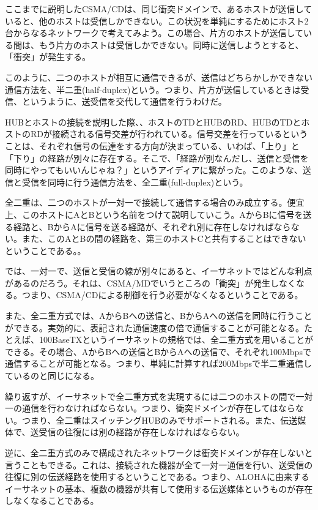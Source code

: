 ここまでに説明したCSMA/CDは、同じ衝突ドメインで、あるホストが送信していると、他のホストは受信しかできない。この状況を単純にするためにホスト2台からなるネットワークで考えてみよう。この場合、片方のホストが送信している間は、もう片方のホストは受信しかできない。同時に送信しようとすると、「衝突」が発生する。

このように、二つのホストが相互に通信できるが、送信はどちらかしかできない通信方法を、半二重(half-duplex)という。つまり、片方が送信しているときは受信、というように、送受信を交代して通信を行うわけだ。

HUBとホストの接続を説明した際、、ホストのTDとHUBのRD、HUBのTDとホストのRDが接続される信号交差が行われている。信号交差を行っているということは、それぞれ信号の伝達をする方向が決まっている、いわば、「上り」と「下り」の経路が別々に存在する。そこで、「経路が別なんだし、送信と受信を同時にやってもいいんじゃね？」というアイディアに繋がった。このような、送信と受信を同時に行う通信方法を、全二重(full-duplex)という。

全二重は、二つのホストが一対一で接続して通信する場合のみ成立する。便宜上、このホストにAとBという名前をつけて説明していこう。AからBに信号を送る経路と、BからAに信号を送る経路が、それぞれ別に存在しなければならない。また、このAとBの間の経路を、第三のホストCと共有することはできないということである。。

では、一対一で、送信と受信の線が別々にあると、イーサネットではどんな利点があるのだろう。それは、CSMA/MDでいうところの「衝突」が発生しなくなる。つまり、CSMA/CDによる制御を行う必要がなくなるということである。

また、全二重方式では、AからBへの送信と、BからAへの送信を同時に行うことができる。実効的に、表記された通信速度の倍で通信することが可能となる。たとえば、100BaseTXというイーサネットの規格では、全二重方式を用いることができる。その場合、AからBへの送信とBからAへの送信で、それぞれ100Mbpsで通信することが可能となる。つまり、単純に計算すれば200Mbpsで半二重通信しているのと同じになる。

繰り返すが、イーサネットで全二重方式を実現するには二つのホストの間で一対一の通信を行わなければならない。つまり、衝突ドメインが存在してはならない。つまり、全二重はスイッチングHUBのみでサポートされる。また、伝送媒体で、送受信の往復には別の経路が存在しなければならない。

逆に、全二重方式のみで構成されたネットワークは衝突ドメインが存在しないと言うこともできる。これは、接続された機器が全て一対一通信を行い、送受信の往復に別の伝送経路を使用するということである。つまり、ALOHAに由来するイーサネットの基本、複数の機器が共有して使用する伝送媒体というものが存在しなくなることである。



